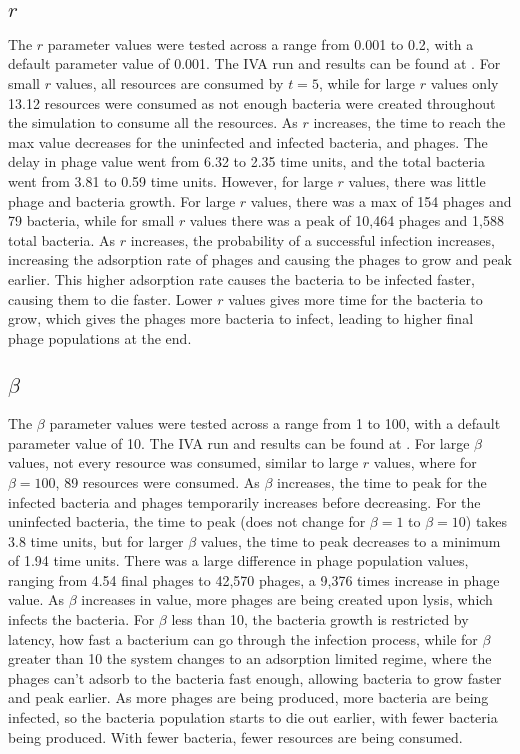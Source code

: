 \subsection{$r$}
The $r$ parameter values were tested across a range from 0.001 to 0.2, with a default parameter value of 0.001. 
The IVA run and results can be found at . 
For small $r$ values, all resources are consumed by $t=5$, while for large $r$ values only 13.12 resources were consumed as not enough bacteria were created throughout the simulation to consume all the resources. 
As $r$ increases, the time to reach the max value decreases for the uninfected and infected bacteria, and phages. The delay in phage value went from 6.32 to 2.35 time units, and the total bacteria went from 3.81 to 0.59 time units. 
However, for large $r$ values, there was little phage and bacteria growth. 
For large $r$ values, there was a max of 154 phages and 79 bacteria, while for small $r$ values there was a peak of 10,464 phages and 1,588 total bacteria. 
As $r$ increases, the probability of a successful infection increases, increasing the adsorption rate of phages and causing the phages to grow and peak earlier. 
This higher adsorption rate causes the bacteria to be infected faster, causing them to die faster. 
Lower $r$ values gives more time for the bacteria to grow, which gives the phages more bacteria to infect, leading to higher final phage populations at the end.

\subsection{$\beta$}
The $\beta$ parameter values were tested across a range from 1 to 100, with a default parameter value of 10. 
The IVA run and results can be found at . 
For large $\beta$ values, not every resource was consumed, similar to large $r$ values, where for $\beta=100$, 89 resources were consumed. 
As $\beta$ increases, the time to peak for the infected bacteria and phages temporarily increases before decreasing. 
For the uninfected bacteria, the time to peak (does not change for $\beta=1$ to $\beta=10$) takes 3.8 time units, but for larger $\beta$ values, the time to peak decreases to a minimum of 1.94 time units. 
There was a large difference in phage population values, ranging from 4.54 final phages to 42,570 phages, a 9,376 times increase in phage value. 
As $\beta$ increases in value, more phages are being created upon lysis, which infects the bacteria. 
For $\beta$ less than 10, the bacteria growth is restricted by latency, how fast a bacterium can go through the infection process, while for $\beta$ greater than 10 the system changes to an adsorption limited regime, where the phages can't adsorb to the bacteria fast enough, allowing bacteria to grow faster and peak earlier. 
As more phages are being produced, more bacteria are being infected, so the bacteria population starts to die out earlier, with fewer bacteria being produced. 
With fewer bacteria, fewer resources are being consumed. 

